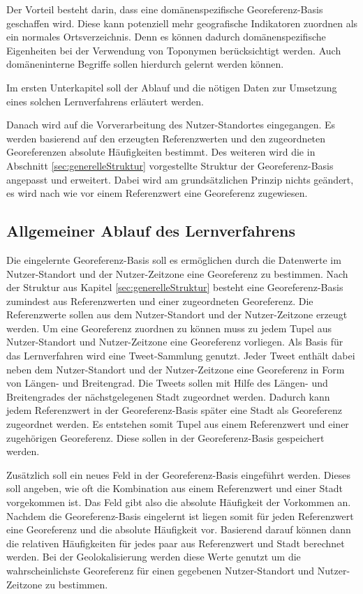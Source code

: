 		Der Vorteil besteht darin, dass eine domänenspezifische Georeferenz-Basis geschaffen wird.
		Diese kann potenziell mehr geografische Indikatoren zuordnen als ein normales Ortsverzeichnis.
		Denn es können dadurch domänenspezifische Eigenheiten bei der Verwendung von Toponymen berücksichtigt werden. 
		Auch domäneninterne Begriffe sollen hierdurch gelernt werden können.

		Im ersten Unterkapitel soll der Ablauf und die nötigen Daten zur Umsetzung eines solchen Lernverfahrens erläutert werden.

		Danach wird auf die Vorverarbeitung des Nutzer-Standortes eingegangen.
		Es werden basierend auf den erzeugten Referenzwerten und den zugeordneten Georeferenzen absolute Häufigkeiten bestimmt.
		Des weiteren wird die in Abschnitt \ref{sec:generelleStruktur} vorgestellte Struktur der Georeferenz-Basis angepasst und erweitert.
		Dabei wird am grundsätzlichen Prinzip nichts geändert, es wird nach wie vor einem Referenzwert eine Georeferenz zugewiesen. 

		\subsection{Allgemeiner Ablauf des Lernverfahrens}

			Die eingelernte Georeferenz-Basis soll es ermöglichen durch die Datenwerte im Nutzer-Standort und der Nutzer-Zeitzone eine Georeferenz zu bestimmen.
			Nach der Struktur aus Kapitel \ref{sec:generelleStruktur} besteht eine Georeferenz-Basis zumindest aus Referenzwerten und einer zugeordneten Georeferenz.
			Die Referenzwerte sollen aus dem Nutzer-Standort und der Nutzer-Zeitzone erzeugt werden.
			Um eine Georeferenz zuordnen zu können muss zu jedem Tupel aus Nutzer-Standort und Nutzer-Zeitzone eine Georeferenz vorliegen.
			Als Basis für das Lernverfahren wird eine Tweet-Sammlung genutzt.
			Jeder Tweet enthält dabei neben dem Nutzer-Standort und der Nutzer-Zeitzone eine Georeferenz in Form von Längen- und Breitengrad. 
			Die Tweets sollen mit Hilfe des Längen- und Breitengrades der nächstgelegenen Stadt zugeordnet werden. 
			Dadurch kann jedem Referenzwert in der Georeferenz-Basis später eine Stadt als Georeferenz zugeordnet werden.
			Es entstehen somit Tupel aus einem Referenzwert und einer zugehörigen Georeferenz.
			Diese sollen in der Georeferenz-Basis gespeichert werden.

			Zusätzlich soll ein neues Feld in der Georeferenz-Basis eingeführt werden.
			Dieses soll angeben, wie oft die Kombination aus einem Referenzwert und einer Stadt vorgekommen ist. 
			Das Feld gibt also die absolute Häufigkeit der Vorkommen an.
			Nachdem die Georeferenz-Basis eingelernt ist liegen somit für jeden Referenzwert eine Georeferenz und die absolute Häufigkeit vor.
			Basierend darauf können dann die relativen Häufigkeiten für jedes paar aus Referenzwert und Stadt berechnet werden.
			Bei der Geolokalisierung werden diese Werte genutzt um die wahrscheinlichste Georeferenz für einen gegebenen Nutzer-Standort und Nutzer-Zeitzone zu bestimmen.

